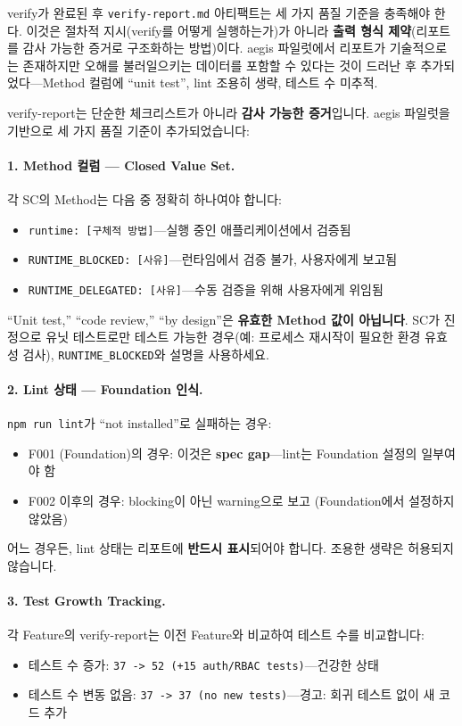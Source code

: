 \documentclass[11pt,a4paper,openright,twoside]{report}
\newcommand{\file}[1]{\texttt{#1}}
\begin{document}
verify가 완료된 후 \file{verify-report.md} 아티팩트는 세 가지 품질 기준을 충족해야 한다. 이것은 절차적 지시(verify를 어떻게 실행하는가)가 아니라 \textbf{출력 형식 제약}(리포트를 감사 가능한 증거로 구조화하는 방법)이다. aegis 파일럿에서 리포트가 기술적으로는 존재하지만 오해를 불러일으키는 데이터를 포함할 수 있다는 것이 드러난 후 추가되었다---Method 컬럼에 ``unit test'', lint 조용히 생략, 테스트 수 미추적.

verify-report는 단순한 체크리스트가 아니라 \textbf{감사 가능한 증거}입니다. aegis 파일럿을 기반으로 세 가지 품질 기준이 추가되었습니다:

\paragraph{1. Method 컬럼 --- Closed Value Set.}
각 SC의 Method는 다음 중 정확히 하나여야 합니다:
\begin{itemize}[nosep]
  \item \texttt{runtime: [구체적 방법]}---실행 중인 애플리케이션에서 검증됨
  \item \texttt{RUNTIME\_BLOCKED: [사유]}---런타임에서 검증 불가, 사용자에게 보고됨
  \item \texttt{RUNTIME\_DELEGATED: [사유]}---수동 검증을 위해 사용자에게 위임됨
\end{itemize}

``Unit test,'' ``code review,'' ``by design''은 \textbf{유효한 Method 값이 아닙니다}. SC가 진정으로 유닛 테스트로만 테스트 가능한 경우(예: 프로세스 재시작이 필요한 환경 유효성 검사), \texttt{RUNTIME\_BLOCKED}와 설명을 사용하세요.

\paragraph{2. Lint 상태 --- Foundation 인식.}
\texttt{npm run lint}가 ``not installed''로 실패하는 경우:
\begin{itemize}[nosep]
  \item F001 (Foundation)의 경우: 이것은 \textbf{spec gap}---lint는 Foundation 설정의 일부여야 함
  \item F002 이후의 경우: blocking이 아닌 warning으로 보고 (Foundation에서 설정하지 않았음)
\end{itemize}

어느 경우든, lint 상태는 리포트에 \textbf{반드시 표시}되어야 합니다. 조용한 생략은 허용되지 않습니다.

\paragraph{3. Test Growth Tracking.}
각 Feature의 verify-report는 이전 Feature와 비교하여 테스트 수를 비교합니다:
\begin{itemize}[nosep]
  \item 테스트 수 증가: \texttt{37 -> 52 (+15 auth/RBAC tests)}---건강한 상태
  \item 테스트 수 변동 없음: \texttt{37 -> 37 (no new tests)}---경고: 회귀 테스트 없이 새 코드 추가
\end{itemize}
\end{document}
